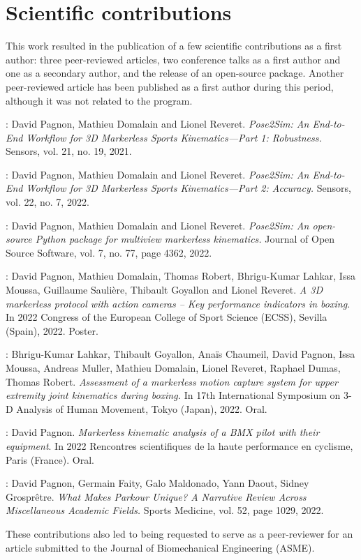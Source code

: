 \newpage
\section*{Scientific contributions}

This work resulted in the publication of a few scientific contributions as a first author: three peer-reviewed articles, two conference talks as a first author and one as a secondary author, and the release of an open-source package.
Another peer-reviewed article has been published as a first author during this period, although it was not related to the program.

\noindent\cite{Pagnon2021}: David Pagnon, Mathieu Domalain and Lionel Reveret. \textit{Pose2Sim: An
End-to-End Workflow for 3D Markerless Sports Kinematics—Part 1:
Robustness.} Sensors, vol. 21, no. 19, 2021.

\noindent\cite{Pagnon2022a}: David Pagnon, Mathieu Domalain and Lionel Reveret. \textit{Pose2Sim: An
End-to-End Workflow for 3D Markerless Sports Kinematics—Part 2:
Accuracy.} Sensors, vol. 22, no. 7, 2022.

\noindent\cite{Pagnon2022b}: David Pagnon, Mathieu Domalain and Lionel Reveret. \textit{Pose2Sim:
An open-source Python package for multiview markerless kinematics.}
Journal of Open Source Software, vol. 7, no. 77, page 4362, 2022.

\noindent\cite{Pagnon2022c}: 
David Pagnon, Mathieu Domalain, Thomas Robert, Bhrigu-Kumar Lahkar, Issa Moussa, Guillaume Saulière, Thibault Goyallon and Lionel Reveret. \textit{A 3D markerless protocol with action cameras – Key performance indicators in boxing.} In 2022 Congress of the European College of Sport Science (ECSS), Sevilla (Spain), 2022. Poster.

\noindent\cite{Lahkar2022a}: 
Bhrigu-Kumar Lahkar, Thibault Goyallon, Anaïs Chaumeil, David Pagnon, Issa Moussa, Andreas Muller, Mathieu Domalain, Lionel Reveret, Raphael Dumas, Thomas Robert. \textit{Assessment of a markerless motion capture system for upper extremity joint kinematics during boxing.} In 17th International Symposium on 3-D Analysis of Human Movement, Tokyo (Japan), 2022. Oral.


\noindent\cite{Pagnon2022e}: 
David Pagnon. \textit{Markerless kinematic analysis of a BMX pilot with their equipment}. In 2022 Rencontres scientifiques de la haute performance en cyclisme, Paris (France). Oral.

\noindent\cite{Pagnon2022d}: 
David Pagnon, Germain Faity, Galo Maldonado, Yann Daout, Sidney Grosprêtre. \textit{What Makes Parkour Unique? A Narrative Review Across Miscellaneous Academic Fields.} Sports Medicine, vol. 52, page 1029, 2022.

\vskip 0.4cm

These contributions also led to being requested to serve as a peer-reviewer for an article submitted to the Journal of Biomechanical Engineering (ASME).